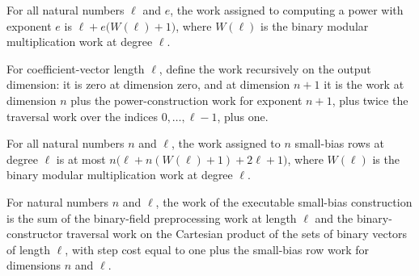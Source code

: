 \begin{theorem}
\label{FABL.executableSmallBiasPowerWork_eq}
\leanok
{}
For all natural numbers $\ell$ and $e$, the work assigned to computing a power with
exponent $e$ is $\ell+e\bigl(W(\ell)+1\bigr)$, where $W(\ell)$ is the binary modular
multiplication work at degree $\ell$.
\end{theorem}

\begin{definition}
\label{FABL.executableSmallBiasRowWork}
\leanok
{}
For coefficient-vector length $\ell$, define the work recursively on the output
dimension: it is zero at dimension zero, and at dimension $n+1$ it is the work at
dimension $n$ plus the power-construction work for exponent $n+1$, plus twice the
traversal work over the indices $0,\ldots,\ell-1$, plus one.
\end{definition}

\begin{theorem}
\label{FABL.executableSmallBiasRowWork_le}
\leanok
{}
For all natural numbers $n$ and $\ell$, the work assigned to $n$ small-bias rows at
degree $\ell$ is at most $n\bigl(\ell+n(W(\ell)+1)+2\ell+1\bigr)$, where $W(\ell)$ is
the binary modular multiplication work at degree $\ell$.
\end{theorem}

\begin{definition}
\label{FABL.executableSmallBiasConstructionWork}
\leanok
{}
For natural numbers $n$ and $\ell$, the work of the executable small-bias construction
is the sum of the binary-field preprocessing work at length $\ell$ and the
binary-constructor traversal work on the Cartesian product of the sets of binary vectors
of length $\ell$, with step cost equal to one plus the small-bias row work for
dimensions $n$ and $\ell$.
\end{definition}

